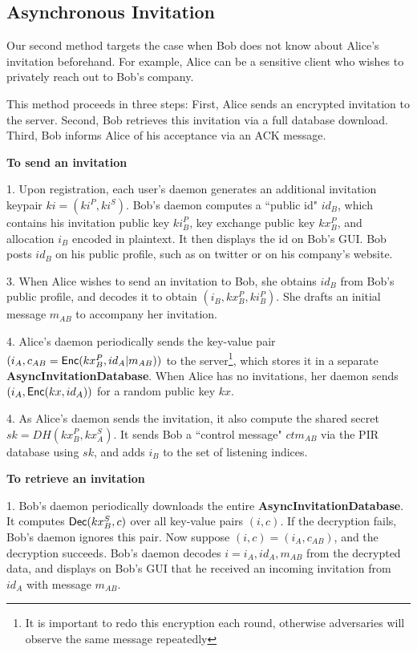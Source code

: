 \subsection{Asynchronous Invitation}


Our second method targets the case when Bob does not know about Alice's invitation beforehand. For example, Alice can be a sensitive client who wishes to privately reach out to Bob's company. 

This method proceeds in three steps: First, Alice sends an encrypted invitation to the server. Second, Bob retrieves this invitation via a full database download. Third, Bob informs Alice of his acceptance via an ACK message.

\textbf{To send an invitation}

1. Upon registration, each user's daemon generates an additional invitation keypair $ki = (ki^P, ki^S)$. Bob's daemon computes a ``public id" $id_B$, which contains his invitation public key $ki_B^P$, key exchange public key $kx_B^P$, and allocation $i_B$ encoded in plaintext. It then displays the id on Bob's GUI. Bob posts $id_B$ on his public profile, such as on twitter or on his company's website.

3. When Alice wishes to send an invitation to Bob, she obtains $id_B$ from Bob's public profile, and decodes it to obtain $(i_B, kx_B^P, ki_B^P)$. She drafts an initial message $m_{AB}$ to accompany her invitation. 

4. Alice's daemon periodically sends the key-value pair $(i_A, c_{AB} = \mathsf{Enc}(kx_B^P, id_A \vert m_{AB}))$ to the server\footnote{It is important to redo this encryption each round, otherwise adversaries will observe the same message repeatedly}, which stores it in a separate \textbf{AsyncInvitationDatabase}. When Alice has no invitations, her daemon sends $(i_A, \mathsf{Enc}(kx, id_A))$ for a random public key $kx$.

4. As Alice's daemon sends the invitation, it also compute the shared secret $sk = DH(kx_B^P, kx^S_A)$. It sends Bob a ``control message" $ctm_{AB}$ via the PIR database using $sk$, and adds $i_B$ to the set of listening indices.

\textbf{To retrieve an invitation}

1. Bob's daemon periodically downloads the entire \textbf{AsyncInvitationDatabase}. It computes $\mathsf{Dec}(kx^S_B, c)$ over all key-value pairs $(i, c)$. If the decryption fails, Bob's daemon ignores this pair. Now suppose $(i, c) = (i_A, c_{AB})$, and the decryption succeeds. Bob's daemon decodes $i = i_A, id_A, m_{AB}$ from the decrypted data, and displays on Bob's GUI that he received an incoming invitation from $id_A$ with message $m_{AB}$.

